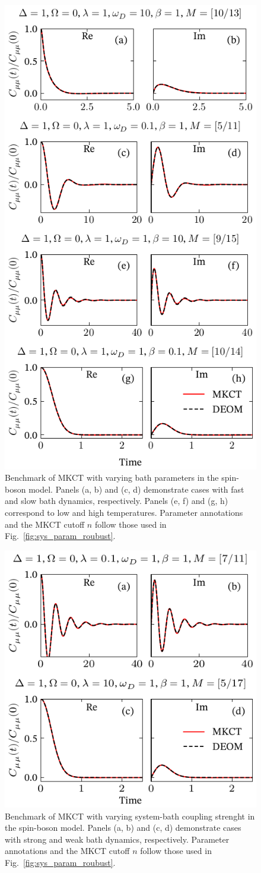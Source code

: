 \documentclass[preprint,aip,jcp]{revtex4-2}
\begin{document}
\begin{figure}[htbp]
    \centering
    \includegraphics[width=0.5\linewidth]{figs/bath_parameters.pdf}
    \caption{Benchmark of MKCT with varying bath parameters in the spin-boson model. Panels (a, b) and (c, d) demonstrate cases with fast and slow bath dynamics, respectively. Panels (e, f) and (g, h) correspond to low and high temperatures. Parameter annotations and the MKCT cutoff $n$ follow those used in Fig.~\ref{fig:sys_param_roubust}.}
    \label{fig:bath_param_roubust}
\end{figure}

\begin{figure}[htbp]
    \centering
    \includegraphics[width=0.5\linewidth]{figs/cp_parameters.pdf}
    \caption{Benchmark of MKCT with varying system-bath coupling strenght in the spin-boson model. Panels (a, b) and (c, d) demonstrate cases with strong and weak bath dynamics, respectively. Parameter annotations and the MKCT cutoff $n$ follow those used in Fig.~\ref{fig:sys_param_roubust}.}
    \label{fig:cp_param_roubust}
\end{figure}

\end{document}
